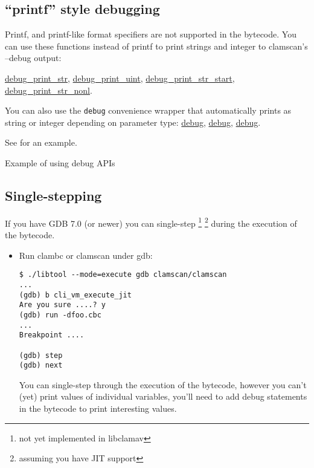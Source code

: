 \subsection{``printf'' style debugging}
Printf, and printf-like format specifiers are not supported in the bytecode.
You can use these functions instead of printf to print strings and integer to
clamscan's --debug output:

\hyperlink{group__debug_gaa6d82179ea15d32450fefbc6d1bd8934}{debug\_\-print\_\-str},
\hyperlink{group__debug_ga6e0cdd4d4c76ed46a8627bee56eee1c1}{debug\_\-print\_\-uint},
\hyperlink{group__debug_ga43707290a22915315c960422a88ba4d4}{debug\_\-print\_\-str\_\-start},
\hyperlink{group__debug_ga02f173e084fc9a4b9eaf3017aa4243ba}{debug\_\-print\_\-str\_\-nonl}.

You can also use the \verb+debug+ convenience wrapper that automatically prints
as string or integer depending on parameter type:
\hyperlink{group__debug_gad98902cb1411dcb98f8a05c15f881f68}{debug},
\hyperlink{group__debug_ga0c4f0f407c72cc2f299fa5afe7251e7c}{debug},
\hyperlink{group__debug_ga49c09fe4114c60b1ebaa6b983fd1f0e7}{debug}.

See  for an example.
\begin{program}

\caption{Example of using debug APIs}
\label{prg:debugapi}
\end{program}

\subsection{Single-stepping}
If you have GDB 7.0 (or newer) you can single-step \footnote{not yet implemented in libclamav} \footnote{assuming you have JIT support}
during the execution of the bytecode.
\begin{itemize}
 \item Run clambc or clamscan under gdb:
\begin{verbatim}
$ ./libtool --mode=execute gdb clamscan/clamscan
...
(gdb) b cli_vm_execute_jit
Are you sure ....? y
(gdb) run -dfoo.cbc
...
Breakpoint ....

(gdb) step
(gdb) next
\end{verbatim}

You can single-step through the execution of the bytecode, however you can't (yet) print values of individual variables,
you'll need to add debug statements in the bytecode to print interesting values.

\end{itemize}


